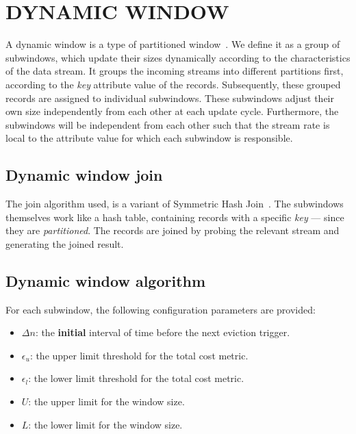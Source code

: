 \section{DYNAMIC WINDOW}%
\label{sec:Dynamic Window}
A dynamic window is a type of partitioned window~\cite{generic_window_sem}.
We define it as a group of subwindows, which update their sizes dynamically according to the characteristics 
of the data stream. It groups the incoming streams into different partitions first, according to 
the \emph{key} attribute value of the records. Subsequently, these grouped records are assigned 
to individual subwindows. These subwindows adjust their own size independently from each other 
at each update cycle. Furthermore, the subwindows will be independent from each other such 
that the stream rate is local to the attribute value for which each subwindow is responsible. 

\subsection{Dynamic window join}
\label{sub:Dynamic window join}

The join algorithm used, is a variant of Symmetric Hash Join~\cite{symmetric_hash_join}. 
The subwindows themselves work like a hash table, containing records with a 
specific \emph{key} --- since they are \emph{partitioned}. 
The records are joined by probing the relevant stream and generating the 
joined result. 


\subsection{Dynamic window algorithm}%
\label{sub:Dynamic window algorithm}
For each subwindow, the following configuration parameters 
are provided: 

\begin{itemize}
    \item $\Delta n$: the \textbf{initial} interval of time before the next eviction trigger. 
    \item $\epsilon_u$: the upper limit threshold for the total cost metric.
    \item $\epsilon_l$: the lower limit threshold for the total cost metric. 
    \item $U$: the upper limit for the window size. 
    \item $L$: the lower limit for the window size. 
\end{itemize}

